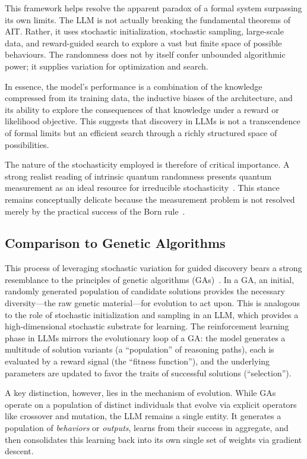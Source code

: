 \documentclass[%
  reprint,
  superscriptaddress,
  showpacs,
  showkeys,
  amsmath,amssymb,
  pra,
  longbibliography,
  floatfix,
  x11names
]{revtex4-2}
\begin{document}
This framework helps resolve the apparent paradox of a formal system surpassing its own limits.
The LLM is not actually breaking the fundamental theorems of AIT. Rather, it uses stochastic initialization, stochastic sampling, large-scale data, and reward-guided search to explore a vast but finite space of possible behaviours. The randomness does not by itself confer unbounded algorithmic power; it supplies variation for optimization and search.

In essence, the model's performance is a combination of the knowledge compressed from its training data, the inductive biases of the architecture, and its ability to explore the consequences of that knowledge under a reward or likelihood objective. This suggests that discovery in LLMs is not a transcendence of formal limits but an efficient search through a richly structured space of possibilities.

The nature of the stochasticity employed is therefore of critical importance.
A strong realist reading of intrinsic quantum randomness presents quantum measurement as an ideal resource for irreducible stochasticity~\cite{zeil-05_nature_ofQuantum}.
This stance remains conceptually delicate because the measurement problem is not resolved merely by the practical success of the Born rule~\cite{vonNeumann2018Feb}.

\subsection{Comparison to Genetic Algorithms}

This process of leveraging stochastic variation for guided discovery
bears a strong resemblance to the principles of genetic algorithms (GAs)~\cite{holland1992adaptation}.
In a GA, an initial, randomly generated population of candidate solutions provides
the necessary diversity---the raw genetic material---for evolution to act upon.
This is analogous to the role of stochastic initialization and sampling in an LLM,
which provides a high-dimensional stochastic substrate for learning.
The reinforcement learning phase in LLMs mirrors the evolutionary loop of a GA:
the model generates a multitude of solution variants (a ``population'' of reasoning paths),
each is evaluated by a reward signal (the ``fitness function''),
and the underlying parameters are updated to favor the traits of successful solutions (``selection'').

A key distinction, however, lies in the mechanism of evolution.
While GAs operate on a population of distinct individuals that evolve via explicit operators
like crossover and mutation, the LLM remains a single entity.
It generates a population of \textit{behaviors} or \textit{outputs},
learns from their success in aggregate, and then consolidates this
learning back into its own single set of weights via gradient descent.
\end{document}
